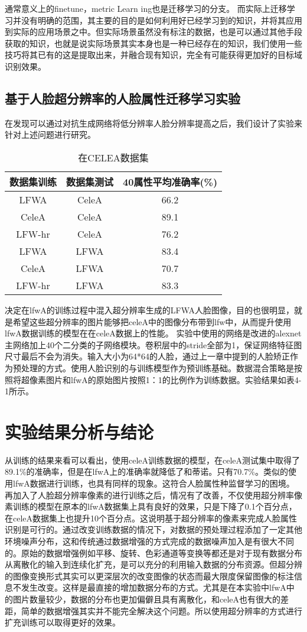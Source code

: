 通常意义上的finetune，metric Learn ing也是迁移学习的分支。
而实际上迁移学习并没有明确的范围，其主要的目的是如何利用好已经学习到的知识，并将其应用到实际的应用场景之中。但实际场景虽然没有标注的数据，也是可以通过其他手段获取的知识，也就是说实际场景其实本身也是一种已经存在的知识，我们使用一些技巧将其已有的这是提取出来，并融合现有知识，完全有可能获得更加好的目标域识别效果。
\subsection{基于人脸超分辨率的人脸属性迁移学习实验}
在发现可以通过对抗生成网络将低分辨率人脸分辨率提高之后，我们设计了实验来针对上述问题进行研究。
\begin{table}[h]
  \centering
   \caption{在CELEA数据集}
   \begin{tabular}{c|c|c}
     \toprule
     数据集训练 &数据集测试 &40属性平均准确率(\%)\\
     \midrule
      LFWA   &  CeleA &  66.2 \\
	  CeleA  &  CeleA &  89.1 \\
	  LFW-hr &  CeleA &  76.2 \\
      LFWA   &  LFWA  &  83.4 \\
	  CeleA  &  LFWA  &  70.7 \\
	  LFW-hr &  LFWA  &  83.3 \\
     \bottomrule
   \end{tabular}
\end{table}
决定在lfwA的训练过程中混入超分辨率生成的LFWA人脸图像，目的也很明显，就是希望这些超分辨率的图片能够把celeA中的图像分布带到lfw中，从而提升使用lfwA数据训练的模型在在celeA数据上的性能。
实验中使用的网络是改进的alexnet主网络加上40个二分类的子网络模块。卷积层中的stride全部为1，保证网络特征图尺寸最后不会为消失。输入大小为64*64的人脸，通过上一章中提到的人脸矫正作为预处理的方式。使用人脸识别的与训练模型作为预训练基础。数据混合策略是按照将超像素图片和lfwA的原始图片按照1：1的比例作为训练数据。实验结果如表4-1所示。

\section{实验结果分析与结论}
从训练的结果来看可以看出，使用celeA训练数据的模型，在celeA测试集中取得了89.1\%的准确率，但是在lfwA上的准确率就降低了和蒂诺。只有70.7\%。类似的使用lfwA数据进行训练，也具有同样的现象。这符合人脸属性种监督学习的困境。
再加入了人脸超分辨率像素的进行训练之后，情况有了改善，不仅使用超分辨率像素训练的模型在原本的lfwA数据集上具有良好的效果，只是下降了0.1个百分点，在celeA数据集上也提升10个百分点。这说明基于超分辨率的像素来完成人脸属性识别是可行的。通过改变训练数据的情况下，对数据的预处理过程添加了一定其他环境噪声分布，这和传统通过数据增强的方式完成的数据噪声加入是有很大不同的。原始的数据增强例如平移、旋转、色彩通道等变换等都还是对于现有数据分布从离散化的输入到连续化扩充，是可以充分的利用输入数据的分布资源。但超分辨的图像变换形式其实可以更深层次的改变图像的状态而最大限度保留图像的标注信息不发生改变。这样是最直接的增加数据分布的方式。尤其是在本实验中lfwA中的图片数量较少，数据的分布也更加偏僻且具有离散化，和celeA也有很大的差距，简单的数据增强其实并不能完全解决这个问题。所以使用超分辨率的方式进行扩充训练可以取得更好的效果。

